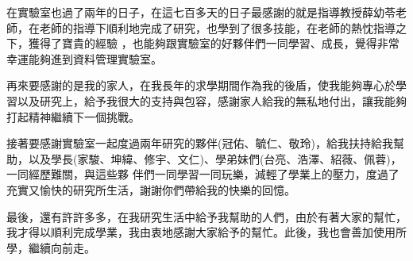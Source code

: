 在實驗室也過了兩年的日子，在這七百多天的日子最感謝的就是指導教授薛幼苓老師，在老師的指導下順利地完成了研究，也學到了很多技能，在老師的熱忱指導之下，獲得了寶貴的經驗
，也能夠跟實驗室的好夥伴們一同學習、成長，覺得非常幸運能夠進到資料管理實驗室。


再來要感謝的是我的家人，在我長年的求學期間作為我的後盾，使我能夠專心於學習以及研究上，給予我很大的支持與包容，感謝家人給我的無私地付出，讓我能夠打起精神繼續下一個挑戰。


接著要感謝實驗室一起度過兩年研究的夥伴(冠佑、毓仁、敬玲)，給我扶持給我幫助，以及學長(家駿、坤緯、修宇、文仁)、學弟妹們(台亮、浩澤、紹薇、佩蓉)，一同經歷難關，與這些夥
伴們一同學習一同玩樂，減輕了學業上的壓力，度過了充實又愉快的研究所生活，謝謝你們帶給我的快樂的回憶。


最後，還有許許多多，在我研究生活中給予我幫助的人們，由於有著大家的幫忙，我才得以順利完成學業，我由衷地感謝大家給予的幫忙。此後，我也會善加使用所學，繼續向前走。
